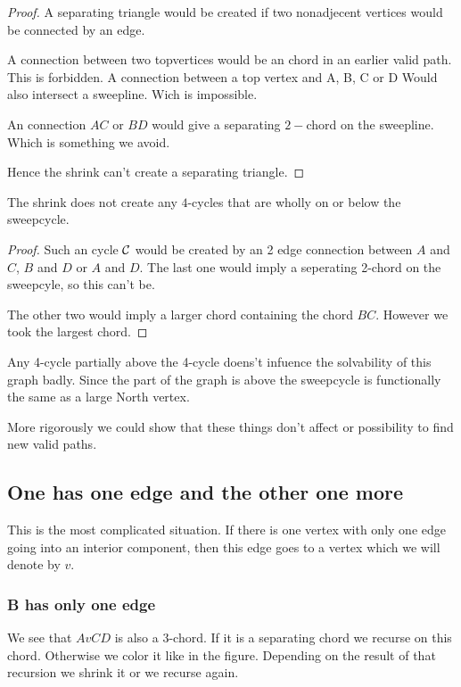 \begin{proof}
  A separating triangle would be created if two nonadjecent vertices would be connected by an edge.

  A connection between two topvertices would be an chord in an earlier valid path. This is forbidden. A connection between a top vertex and A, B, C or D Would also intersect a sweepline. Wich is impossible.

  An connection $AC$ or $BD$ would give a separating $2-$chord on the sweepline. Which is something we avoid.

  Hence the shrink can't create a separating triangle.
\end{proof}



\begin{lemma}
  \label{lm:}
  The shrink does not create any $4$-cycles that are wholly on or below the sweepcycle.
\end{lemma}

\begin{proof}
  Such an cycle $\mathcal{C}$ would be created by an 2 edge connection between $A$ and $C$, $B$ and $D$ or $A$ and $D$. The last one would imply a seperating 2-chord on the sweepcyle, so this can't be.

  The other two would imply a larger chord containing the chord $BC$. However we took the largest chord.
\end{proof}

Any 4-cycle partially above the 4-cycle doens't infuence the solvability of this graph badly. Since the part of the graph is above the sweepcycle is functionally the same as a large North vertex. 

More rigorously we could show that these things don't affect or possibility to find new valid paths.


\subsection{One has one edge and the other one more}
This is the most complicated situation. If there is one vertex with only one edge going into an interior component, then this edge goes to a vertex which we will denote by $v$.

\subsubsection{B has only one edge}
We see that $AvCD$ is also a 3-chord. If it is a separating chord we recurse on this chord. Otherwise we color it like in the figure. Depending on the result of that recursion we shrink it or we recurse again.

